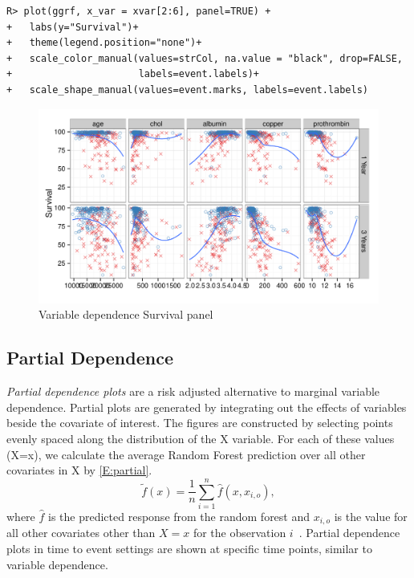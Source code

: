 \documentclass[nojss]{jss}\usepackage[]{graphicx}\usepackage[]{color}
\makeatletter
\def\maxwidth{ %
  \ifdim\Gin@nat@width>\linewidth
    \linewidth
  \else
    \Gin@nat@width
  \fi
}
\newenvironment{kframe}{%
 \def\at@end@of@kframe{}%
 \ifinner\ifhmode%
  \def\at@end@of@kframe{\end{minipage}}%
  \begin{minipage}{\columnwidth}%
 \fi\fi%
 \def\FrameCommand##1{\hskip\@totalleftmargin \hskip-\fboxsep
 \colorbox{shadecolor}{##1}\hskip-\fboxsep
     \hskip-\linewidth \hskip-\@totalleftmargin \hskip\columnwidth}%
 \MakeFramed {\advance\hsize-\width
   \@totalleftmargin\z@ \linewidth\hsize
   \@setminipage}}%
 {\par\unskip\endMakeFramed%
 \at@end@of@kframe}
\newenvironment{knitrout}{}{} %
\makeatother
\begin{document}
\begin{knitrout}\footnotesize
{}\color{fgcolor}\begin{kframe}
\begin{verbatim}
R> plot(ggrf, x_var = xvar[2:6], panel=TRUE) +
+   labs(y="Survival")+
+   theme(legend.position="none")+
+   scale_color_manual(values=strCol, na.value = "black", drop=FALSE,
+                      labels=event.labels)+
+   scale_shape_manual(values=event.marks, labels=event.labels)
\end{verbatim}
\end{kframe}\begin{figure}[!htpb]

{\centering \includegraphics[width=\maxwidth]{figure/rfs-variable-plotCombines-1} 

}

\caption[Variable dependence Survival panel]{Variable dependence Survival panel\label{fig:variable-plotCombines}}
\end{figure}


\end{knitrout}

\subsection{Partial Dependence}\label{S:partialDependence}

\emph{Partial dependence plots} are a risk adjusted alternative to marginal variable dependence. Partial plots are generated by integrating out the effects of variables beside the covariate of interest. The figures are constructed by selecting points evenly spaced along the distribution of the X variable. For each of these values (X=x), we calculate the average Random Forest prediction over all other covariates in X by \eqref{E:partial}.
\begin{equation}
\tilde{f}(x) = \frac{1}{n} \sum_{i=1}^n \hat{f}(x, x_{i,o}),
\label{E:partial}
\end{equation}
where $\hat{f}$ is the predicted response from the random forest and $x_{i,o}$ is the value for all other covariates other than $X=x$ for the observation $i$~\citep{FriedmanGreedyfunction:2000}. Partial dependence plots in time to event settings are shown at specific time points, similar to variable dependence.
\end{document}
